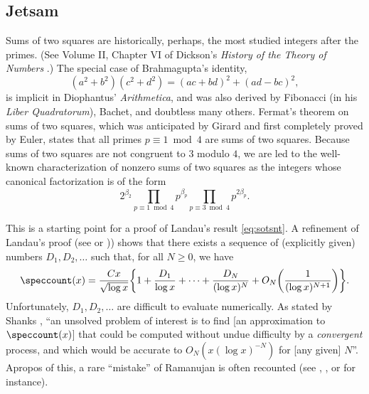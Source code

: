 \documentclass[12pt, reqno, twoside, letterpaper]{amsart}
\begin{document}

\begin{jetsam}

\section{Jetsam}
 \label{sec:jetsam}
 
 
Sums of two squares are historically, perhaps, the most studied 
integers after the primes.
%
(See Volume II, Chapter VI of Dickson's {\em History of the Theory 
of Numbers} \cite{DIC:19}.)
%
The special case of Brahmagupta's identity, 
\[
 (a^2 + b^2)(c^2 + d^2) 
  =
   (ac + bd)^2 + (ad - bc)^2,
\]
is implicit in Diophantus' {\em Arithmetica}, and was also derived 
by Fibonacci (in his {\em Liber Quadratorum}), Bachet, and 
doubtless many others.
%
Fermat's theorem on sums of two squares, which was anticipated by 
Girard and first completely proved by Euler, states that all 
primes $p \equiv 1 \bmod 4$ are sums of two squares.
%
Because sums of two squares are not congruent to $3$ modulo $4$, 
we are led to the well-known characterization of nonzero sums of 
two squares as the integers whose canonical factorization is of 
the form  
\begin{equation}
 \label{eq:canfac}
   2^{\beta_2}
    \prod_{p \equiv 1 \bmod 4}p^{\beta_p}
     \prod_{p \equiv 3 \bmod 4}p^{2\beta_p}.
\end{equation}

This is a starting point for a proof of Landau's result 
\eqref{eq:sotsnt}.
%
A refinement of Landau's proof (see \cite[(4.6.4)]{HAR:40} or 
\cite[II.5, Theorem 3]{TEN:95})) shows that there exists a 
sequence of (explicitly given) numbers $D_1,D_2,\ldots$ such that, 
for all $N \ge 0$, we have
\begin{equation}
 \label{eq:sotsntii}
 \speccount(x)
  =
   \frac{Cx}{\sqrt{\log x}}
    \bigg\{
     1 + \frac{D_1}{\log x} + \cdots + \frac{D_N}{(\log x)^N} + 
       O_N\bigg(\frac{1}{(\log x)^{N + 1}}\bigg) 
    \bigg\}. 
\end{equation}
%
Unfortunately, $D_1,D_2,\ldots$ are difficult to evaluate 
numerically. 
%
As stated by Shanks \cite{SHA:64}, ``an unsolved problem of 
interest is to find [an approximation to $\speccount(x)$] that could 
be computed without undue difficulty by a {\em convergent} 
process, and which would be accurate to $O_N(x(\log x)^{-N})$ for 
[any given] $N$''.
%
Apropos of this, a rare ``mistake'' of Ramanujan is often 
recounted (see \cite[Chapter IV]{HAR:40}, \cite{STA:28, SHA:64}, 
or \cite[pp.\ xxiv--xxviii]{RAM:00} for instance). 


\end{jetsam}
\end{document}
